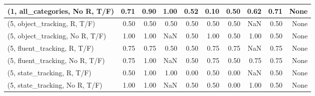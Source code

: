 \begin{table*}[h!]
\begin{adjustbox}{width=2\columnwidth,center}
\begin{tabular}{lrrr|rrr|rrr}
(1, all\_categories, No R, T/F)       &                      0.71 &                  0.90 &                      1.00 &                          0.52 &                      0.10 &                          0.50 &                                   0.62 &                               0.71 &                                  None \\



\midrule
(5, object\_tracking, R, T/F)         &                      0.50 &                  0.50 &                      0.50 &                          0.50 &                      0.50 &                          0.50 &                                    NaN &                               0.50 &                                  None \\
(5, object\_tracking, No R, T/F)      &                      1.00 &                  1.00 &                       NaN &                          0.50 &                      1.00 &                          0.50 &                                   1.00 &                               0.50 &                                  None \\
(5, fluent\_tracking, R, T/F)         &                      0.75 &                  0.75 &                      0.50 &                          0.50 &                      0.75 &                          0.75 &                                    NaN &                               0.75 &                                  None \\
(5, fluent\_tracking, No R, T/F)      &                      0.75 &                  1.00 &                       NaN &                          0.50 &                      0.75 &                          0.50 &                                   0.75 &                               0.75 &                                  None \\
(5, state\_tracking, R, T/F)          &                      0.50 &                  1.00 &                      1.00 &                          0.00 &                      0.50 &                          0.00 &                                    NaN &                               0.50 &                                  None \\
(5, state\_tracking, No R, T/F)       &                      1.00 &                  1.00 &                       NaN &                          0.50 &                      0.50 &                          0.00 &                                   1.00 &                               0.50 &                                  None \\

\end{tabular}
\end{adjustbox}
\end{table*}
